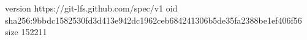 version https://git-lfs.github.com/spec/v1
oid sha256:9bbdc1582530fd3d413e942dc1962ceb684241306b5de35fa2388be1ef406f56
size 152211
